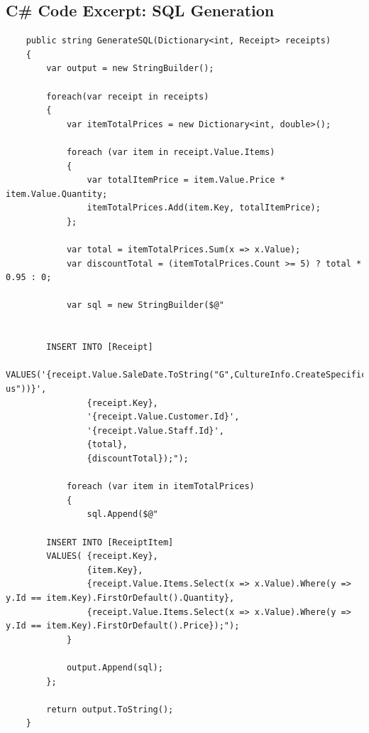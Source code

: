 \documentclass{article}
\begin{document}
    \newpage
    \subsection{C\# Code Excerpt: SQL Generation}
    \label{sec:sharpcsqlgeneration}
    \begin{lstlisting}
    public string GenerateSQL(Dictionary<int, Receipt> receipts)
    {
        var output = new StringBuilder();

        foreach(var receipt in receipts)
        {
            var itemTotalPrices = new Dictionary<int, double>();

            foreach (var item in receipt.Value.Items)
            {
                var totalItemPrice = item.Value.Price * item.Value.Quantity;
                itemTotalPrices.Add(item.Key, totalItemPrice);
            };

            var total = itemTotalPrices.Sum(x => x.Value);
            var discountTotal = (itemTotalPrices.Count >= 5) ? total * 0.95 : 0;

            var sql = new StringBuilder($@"


        INSERT INTO [Receipt] 
        VALUES('{receipt.Value.SaleDate.ToString("G",CultureInfo.CreateSpecificCulture("en-us"))}',
                {receipt.Key},
                '{receipt.Value.Customer.Id}',
                '{receipt.Value.Staff.Id}',
                {total},
                {discountTotal});");

            foreach (var item in itemTotalPrices)
            {
                sql.Append($@"

        INSERT INTO [ReceiptItem]
        VALUES( {receipt.Key},
                {item.Key},
                {receipt.Value.Items.Select(x => x.Value).Where(y => y.Id == item.Key).FirstOrDefault().Quantity},
                {receipt.Value.Items.Select(x => x.Value).Where(y => y.Id == item.Key).FirstOrDefault().Price});");
            }

            output.Append(sql);
        };

        return output.ToString();
    }
    \end{lstlisting}
    
    
\end{document}
